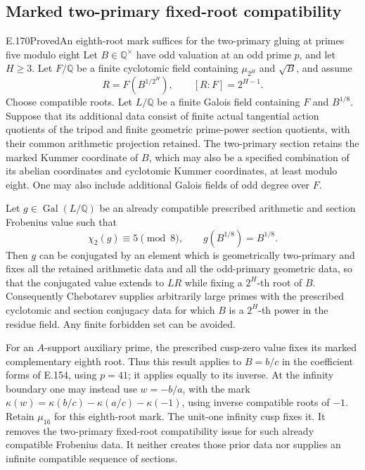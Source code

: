 \subsection{Marked two-primary fixed-root compatibility}

\begin{result}{E.170}{Proved}{An eighth-root mark suffices for the two-primary gluing at primes five modulo eight}
Let \(B\in\mathbb Q^{\times}\) have odd valuation at an odd
prime \(p\), and let \(H\ge3\). Let \(F/\mathbb Q\) be a finite
cyclotomic field containing \(\mu_{2^H}\) and \(\sqrt B\), and assume
\[
 R=F(B^{1/2^H}),\qquad [R:F]=2^{H-1}.
 \tag{E.170.1}
\]
Choose compatible roots. Let \(L/\mathbb Q\) be a finite
Galois field containing \(F\) and \(B^{1/8}\). Suppose that its
additional data consist of finite actual tangential action quotients
of the tripod and finite geometric prime-power section quotients,
with their common arithmetic projection retained. The two-primary
section retains the marked Kummer coordinate of \(B\), which may
also be a specified combination of its abelian coordinates and
cyclotomic Kummer coordinates, at least modulo eight. One may
also include additional Galois fields of odd degree over \(F\).

Let \(g\in\operatorname{Gal}(L/\mathbb Q)\) be an already
compatible prescribed arithmetic and section Frobenius value such
that
\[
 \chi_2(g)\equiv5\pmod8,\qquad g(B^{1/8})=B^{1/8}.
 \tag{E.170.2}
\]
Then \(g\) can be conjugated by an element which is geometrically
two-primary and fixes all the retained arithmetic data and all the
odd-primary geometric data, so that the conjugated value extends to
\(LR\) while fixing a \(2^H\)-th root of \(B\).
Consequently Chebotarev supplies arbitrarily large primes with the
prescribed cyclotomic and section conjugacy data for which \(B\)
is a \(2^H\)-th power in the residue field. Any finite forbidden
set can be avoided.

For an \(A\)-support auxiliary prime, the prescribed cusp-zero
value fixes its marked complementary eighth root. Thus this result
applies to \(B=b/c\) in the coefficient forms of E.154, using
\(p=41\); it applies equally to its inverse. At the infinity
boundary one may instead use \(w=-b/a\), with the mark
\(\kappa(w)=\kappa(b/c)-\kappa(a/c)-\kappa(-1)\), using
inverse compatible roots of \(-1\). Retain \(\mu_{16}\) for
this eighth-root mark. The unit-one infinity cusp fixes it.
It removes the
two-primary fixed-root compatibility issue for such already
compatible Frobenius data. It neither creates those prior data nor
supplies an infinite compatible sequence of sections.
\end{result}
